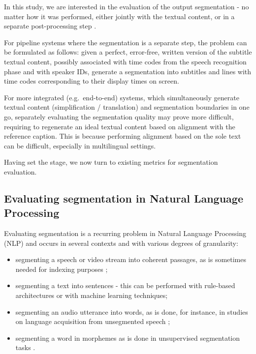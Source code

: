 \documentclass{article}
\begin{document}
In this study, we are interested in the evaluation of the output segmentation - no matter how it was performed, either jointly with the textual content, or in a separate post-processing step \cite{Matusov19customizing}.

For pipeline systems where the segmentation is a separate step, the problem can be formulated as follows: given a perfect, error-free, written version of the  subtitle textual content, possibly associated with time codes from the speech recognition phase and with speaker IDs, generate a segmentation into subtitles and lines with time codes corresponding to their display times on screen. 

For more integrated (e.g.\ end-to-end) systems, which simultaneously generate textual content (simplification / translation) and segmentation boundaries in one go, separately evaluating the segmentation quality may prove more difficult, requiring to regenerate an ideal textual content based on alignment with the reference caption. This is because performing alignment based on the sole text can be difficult, especially in multilingual settings.

Having set the stage, we now turn to existing metrics for segmentation evaluation. 

\subsection{Evaluating segmentation in Natural Language Processing}
Evaluating segmentation is a recurring problem in Natural Language Processing (NLP) and occurs in several contexts and with various degrees of granularity:
\begin{itemize}
\item segmenting a speech or video stream into coherent passages, as is sometimes needed for indexing purposes \cite{Hearst97textiling};
\item segmenting a text into sentences - this can be performed with rule-based architectures or with machine learning techniques;
\item segmenting an audio utterance into words, as is done, for instance, in studies on language acquisition from unsegmented speech \cite{Goldwater09bayesian};
\item segmenting a word in morphemes as is done in unsupervised segmentation tasks \cite{Creutz02unsupervised}.
\end{itemize}
\end{document}
